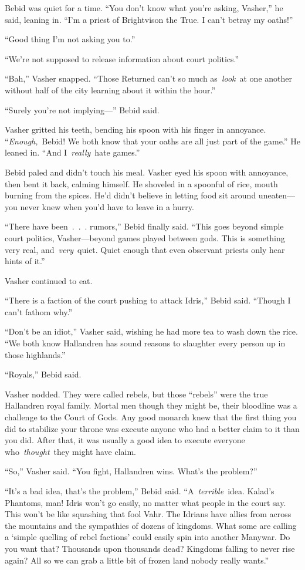 Bebid was quiet for a time. “You don’t know what you’re asking, Vasher,” he said, leaning in. “I’m a priest of Brightvison the True. I can’t betray my oaths!”

“Good thing I’m not asking you to.”

“We’re not supposed to release information about court politics.”

“Bah,” Vasher snapped. “Those Returned can’t so much as~\textit{look}~at one another without half of the city learning about it within the hour.”

“Surely you’re not implying—” Bebid said.

Vasher gritted his teeth, bending his spoon with his finger in annoyance. “\textit{Enough,}~Bebid! We both know that your oaths are all just part of the game.” He leaned in. “And I~\textit{really}~hate games.”

Bebid paled and didn’t touch his meal. Vasher eyed his spoon with annoyance, then bent it back, calming himself. He shoveled in a spoonful of rice, mouth burning from the spices. He’d didn’t believe in letting food sit around uneaten—you never knew when you’d have to leave in a hurry.

“There have been~.~.~. rumors,” Bebid finally said. “This goes beyond simple court politics, Vasher—beyond games played between gods. This is something very real, and~\textit{very}~quiet. Quiet enough that even observant priests only hear hints of it.”

Vasher continued to eat.

“There is a faction of the court pushing to attack Idris,” Bebid said. “Though I can’t fathom why.”

“Don’t be an idiot,” Vasher said, wishing he had more tea to wash down the rice. “We both know Hallandren has sound reasons to slaughter every person up in those highlands.”

“Royals,” Bebid said.

Vasher nodded. They were called rebels, but those “rebels” were the true Hallandren royal family. Mortal men though they might be, their bloodline was a challenge to the Court of Gods. Any good monarch knew that the first thing you did to stabilize your throne was execute anyone who had a better claim to it than you did. After that, it was usually a good idea to execute everyone who~\textit{thought}~they might have claim.

“So,” Vasher said. “You fight, Hallandren wins. What’s the problem?”

“It’s a bad idea, that’s the problem,” Bebid said. “A~\textit{terrible}~idea. Kalad’s Phantoms, man! Idris won’t go easily, no matter what people in the court say. This won’t be like squashing that fool Vahr. The Idrians have allies from across the mountains and the sympathies of dozens of kingdoms. What some are calling a ‘simple quelling of rebel factions’ could easily spin into another Manywar. Do you want that? Thousands upon thousands dead? Kingdoms falling to never rise again? All so we can grab a little bit of frozen land nobody really wants.”

